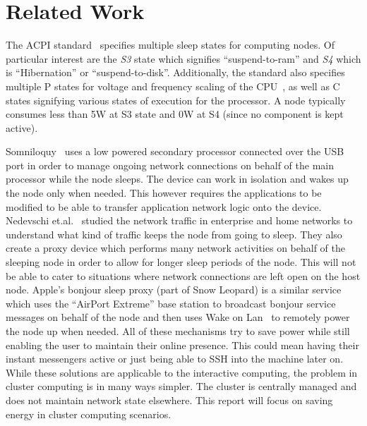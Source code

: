 \section{Related Work} %
\label{sec:related_work}

The ACPI standard~\cite{acpi} specifies multiple sleep states for computing nodes. Of particular interest are the {\em S3} state which signifies ``suspend-to-ram'' and {\em S4} which is ``Hibernation'' or ``suspend-to-disk''. Additionally, the standard also specifies multiple P states for voltage and frequency scaling of the CPU~\cite{Bo:04}, as well as C states signifying various states of execution for the processor. A node typically consumes less than 5W at S3 state and 0W at S4 (since no component is kept active). %

Somniloquy~\cite{Yuvraj:09} uses a low powered secondary processor connected over the USB port in order to manage ongoing network connections on behalf of the main processor while the node sleeps. The device can work in isolation and wakes up the node only when needed. This however requires the applications to be modified to be able to transfer application network logic onto the device. Nedevschi et.al.~\cite{Sergiu:09} studied the network traffic in enterprise and home networks to understand what kind of traffic keeps the node from going to sleep. They also create a proxy device which performs many network activities on behalf of the sleeping node in order to allow for longer sleep periods of the node. This will not be able to cater to situations where network connections are left open on the host node. Apple's bonjour sleep proxy (part of Snow Leopard) is a similar service which uses the ``AirPort Extreme'' base station to broadcast bonjour service messages on behalf of the node and then uses Wake on Lan~\cite{wol} to remotely power the node up when needed. All of these mechanisms try to save power while still enabling the user to maintain their online presence. This could mean having their instant messengers active or just being able to SSH into the machine later on. While these solutions are applicable to the interactive computing, the problem in cluster computing is in many ways simpler. The cluster is centrally managed and does not maintain network state elsewhere. This report will focus on saving energy in cluster computing scenarios.

